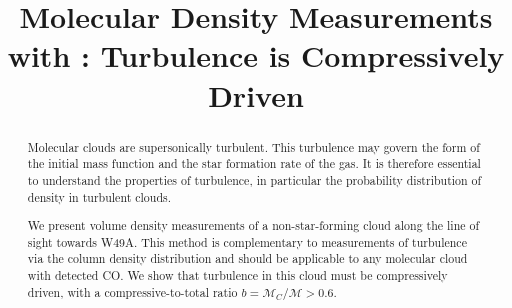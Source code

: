 \title{Molecular Density Measurements with \formaldehyde: Turbulence is
    Compressively Driven}
\begin{abstract}
    Molecular clouds are supersonically turbulent.  This turbulence may govern
    the form of the initial mass function and the star formation rate of the
    gas.  It is therefore essential to understand the properties of turbulence,
    in particular the probability distribution of density in turbulent clouds.

    We present \formaldehyde volume density measurements of a non-star-forming cloud
    along the line of sight towards W49A.  This method is complementary to
    measurements of turbulence via the column density distribution and should
    be applicable to any molecular cloud with detected CO.  We show that
    turbulence in this cloud must be compressively driven, with a
    compressive-to-total ratio $b = \mathcal{M}_C/\mathcal{M}>0.6$.  
\end{abstract}
